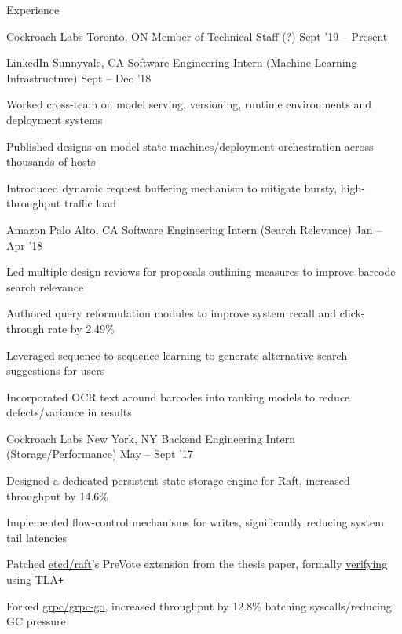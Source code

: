 \documentclass{resume} %
\begin{document}
\begin{rSection}{Experience}
  \begin{rEmptyWorkSection}{Cockroach Labs}
                      {Toronto, ON}
                      {Member of Technical Staff (?)}
                      {Sept '19 -- Present}
  \end{rEmptyWorkSection}

  \begin{rWorkSection}{LinkedIn}
                      {Sunnyvale, CA}
                      {Software Engineering Intern (Machine Learning Infrastructure)}
                      {Sept -- Dec '18}
    \item Worked cross-team on model serving, versioning, runtime environments and
      deployment systems
    \item Published designs on model state
      machines/deployment orchestration across thousands of hosts
    \item Introduced dynamic request buffering mechanism to mitigate bursty,
      high-throughput traffic load
  \end{rWorkSection}

  \begin{rWorkSection}{Amazon}
                     {Palo Alto, CA}
                     {Software Engineering Intern (Search Relevance)}
                     {Jan -- Apr '18}
    \item Led multiple design reviews for proposals outlining measures to
      improve barcode search relevance
    \item Authored query reformulation modules to improve system recall and
      click-through rate by 2.49\%
    \item Leveraged sequence-to-sequence learning to generate alternative
      search suggestions for users
    \item Incorporated OCR text around barcodes into ranking models to reduce
      defects/variance in results
  \end{rWorkSection}

  \begin{rWorkSection}{Cockroach Labs}
                     {New York, NY}
                     {Backend Engineering Intern (Storage/Performance)}
                     {May -- Sept '17}
    \item Designed a dedicated persistent state
      \href{https://github.com/cockroachdb/cockroach/pull/16361}{\underline
      {storage engine}} for Raft, increased throughput by 14.6\%
    \item Implemented flow-control mechanisms for writes, significantly reducing
      system tail latencies
    \item Patched
      \href{https://github.com/coreos/etcd/pull/8288}{\underline{etcd/raft}}'s
      PreVote extension from the thesis paper, formally
      \href{https://github.com/irfansharif/raft.tla/commit/22b05818b6bcfe6719a708f2270a1308fecbc0fa}{\underline {verifying}}
      using TLA\texttt{+}
    \item Forked \href{https://github.com/irfansharif/grpc-go}{\underline{grpc/grpc-go}},
      increased throughput by 12.8\% batching syscalls/reducing GC pressure
  \end{rWorkSection}


\end{rSection}
\end{document}
